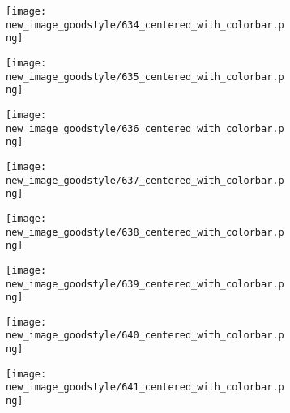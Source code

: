 \documentclass[a4paper,12pt]{article}
\begin{document}
\begin{figure}[H]
  \begin{subfigure}{0.11\textwidth}
    \texttt{[image: new\_image\_goodstyle/634\_centered\_with\_colorbar.png]}
  \end{subfigure}
  \hfill
  \begin{subfigure}{0.11\textwidth}
    \texttt{[image: new\_image\_goodstyle/635\_centered\_with\_colorbar.png]}
  \end{subfigure}
  \hfill
  \begin{subfigure}{0.11\textwidth}
    \texttt{[image: new\_image\_goodstyle/636\_centered\_with\_colorbar.png]}
  \end{subfigure}
  \hfill
  \begin{subfigure}{0.11\textwidth}
    \texttt{[image: new\_image\_goodstyle/637\_centered\_with\_colorbar.png]}
  \end{subfigure}
  \hfill
  \begin{subfigure}{0.11\textwidth}
    \texttt{[image: new\_image\_goodstyle/638\_centered\_with\_colorbar.png]}
  \end{subfigure}
  \hfill
  \begin{subfigure}{0.11\textwidth}
    \texttt{[image: new\_image\_goodstyle/639\_centered\_with\_colorbar.png]}
  \end{subfigure}
  \hfill
  \begin{subfigure}{0.11\textwidth}
    \texttt{[image: new\_image\_goodstyle/640\_centered\_with\_colorbar.png]}
  \end{subfigure}
  \hfill
  \begin{subfigure}{0.11\textwidth}
    \texttt{[image: new\_image\_goodstyle/641\_centered\_with\_colorbar.png]}
  \end{subfigure}
  \hfill
\end{figure}
\end{document}
